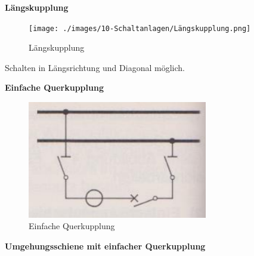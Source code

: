 \begin{minipage}[t]{0.65\textwidth}
    \noindent
    \begin{minipage}[t]{0.45\textwidth}
        \textbf{Längskupplung}

        \begin{figure}[H]
            \centering
            \texttt{[image: ./images/10-Schaltanlagen/Längskupplung.png]}
            \captionsetup{singlelinecheck=off}
            \caption[Längskupplung]{\newline Längskupplung}
        \end{figure}
    
        Schalten in Längsrichtung und Diagonal möglich.
    \end{minipage}%
    \hspace{0.1\textwidth}%
    \begin{minipage}[t]{0.55\textwidth}
        \textbf{Einfache Querkupplung}

        \begin{figure}[H]
            \centering
            \includegraphics[width=0.7\textwidth]{./images/10-Schaltanlagen/Querkupplung-Einfach.png}
            \captionsetup{singlelinecheck=off}
            \caption[Einfache Querkupplung]{\newline Einfache Querkupplung}
        \end{figure}
    \end{minipage}

    \vspace{1em}

    \textbf{Umgehungsschiene mit einfacher Querkupplung}


\end{minipage}
